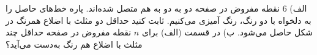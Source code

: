 \EXERCISE
الف)
$6$
نقطه مفروض در صفحه دو به دو به هم متصل شده‌اند. پاره خط‌های حاصل را به دلخواه با دو رنگ، رنگ آمیزی می‌کنیم. ثابت کنید حداقل دو مثلث با اضلاع همرنگ در شکل حاصل می‌شود.
ب) در قسمت (الف) برای
$n$
نقطه مفروض در صفحه حداقل چند مثلث با اضلاع هم رنگ به‌دست می‌آید؟